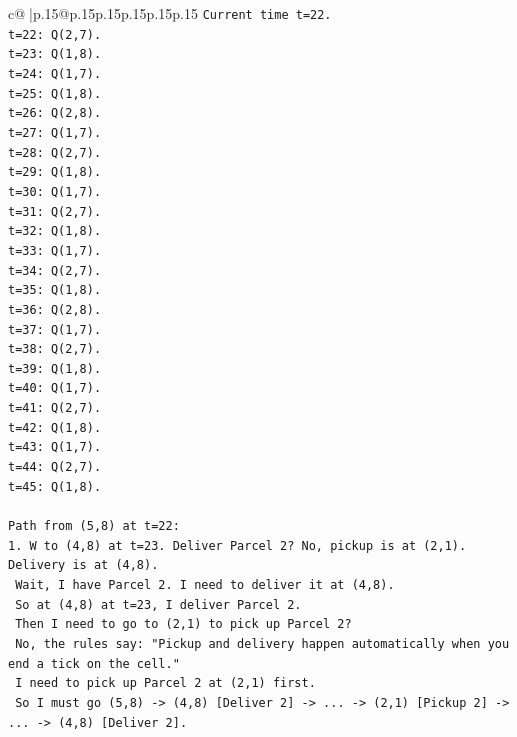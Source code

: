 \documentclass{article}
\begin{document}
{\begin{supertabular}{c@{$\;$}|p{.15\linewidth}@{}p{.15\linewidth}p{.15\linewidth}p{.15\linewidth}p{.15\linewidth}p{.15\linewidth}}
{{{\texttt{Current time t=22.} \\
\texttt{t=22: Q(2,7).} \\
\texttt{t=23: Q(1,8).} \\
\texttt{t=24: Q(1,7).} \\
\texttt{t=25: Q(1,8).} \\
\texttt{t=26: Q(2,8).} \\
\texttt{t=27: Q(1,7).} \\
\texttt{t=28: Q(2,7).} \\
\texttt{t=29: Q(1,8).} \\
\texttt{t=30: Q(1,7).} \\
\texttt{t=31: Q(2,7).} \\
\texttt{t=32: Q(1,8).} \\
\texttt{t=33: Q(1,7).} \\
\texttt{t=34: Q(2,7).} \\
\texttt{t=35: Q(1,8).} \\
\texttt{t=36: Q(2,8).} \\
\texttt{t=37: Q(1,7).} \\
\texttt{t=38: Q(2,7).} \\
\texttt{t=39: Q(1,8).} \\
\texttt{t=40: Q(1,7).} \\
\texttt{t=41: Q(2,7).} \\
\texttt{t=42: Q(1,8).} \\
\texttt{t=43: Q(1,7).} \\
\texttt{t=44: Q(2,7).} \\
\texttt{t=45: Q(1,8).} \\
\\ 
\texttt{Path from (5,8) at t=22:} \\
\texttt{1. W to (4,8) at t=23. Deliver Parcel 2? No, pickup is at (2,1). Delivery is at (4,8).} \\
\texttt{   Wait, I have Parcel 2. I need to deliver it at (4,8).} \\
\texttt{   So at (4,8) at t=23, I deliver Parcel 2.} \\
\texttt{   Then I need to go to (2,1) to pick up Parcel 2?} \\
\texttt{   No, the rules say: "Pickup and delivery happen automatically when you end a tick on the cell."} \\
\texttt{   I need to pick up Parcel 2 at (2,1) first.} \\
\texttt{   So I must go (5,8) {-}> (4,8) {[}Deliver 2{]} {-}> ... {-}> (2,1) {[}Pickup 2{]} {-}> ... {-}> (4,8) {[}Deliver 2{]}.} \\
}}}
\end{supertabular}}
\end{document}
